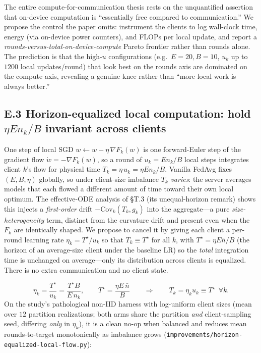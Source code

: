 \documentclass[11pt]{article}
\begin{document}
The entire compute-for-communication thesis rests on the unquantified assertion that on-device computation is ``essentially free compared to communication.'' We propose the control the paper omits: instrument the clients to log wall-clock time, energy (via on-device power counters), and FLOPs per local update, and report a \emph{rounds-versus-total-on-device-compute} Pareto frontier rather than rounds alone. The prediction is that the high-$u$ configurations (e.g.\ $E{=}20,B{=}10$, $u_k$ up to $1200$ local updates/round) that look best on the rounds axis are dominated on the compute axis, revealing a genuine knee rather than ``more local work is always better.''

\subsection*{E.3 Horizon-equalized local computation: hold $\eta E n_k/B$ invariant across clients}

One step of local SGD $w\leftarrow w-\eta\,\nabla F_k(w)$ is one forward-Euler step of the gradient flow $\dot w=-\nabla F_k(w)$, so a round of $u_k=En_k/B$ local steps integrates client $k$'s flow for physical time $T_k=\eta\,u_k=\eta E n_k/B$. Vanilla FedAvg fixes $(E,B,\eta)$ globally, so under client-size imbalance $T_k$ \emph{varies}: the server averages models that each flowed a different amount of time toward their own local optimum. The effective-ODE analysis of \S T.3 (its unequal-horizon remark) shows this injects a \emph{first-order} drift $-\mathrm{Cov}_k(T_k,g_k)$ into the aggregate---a pure \emph{size-heterogeneity} term, distinct from the curvature drift and present even when the $F_k$ are identically shaped. We propose to cancel it by giving each client a per-round learning rate $\eta_k=T^\star/u_k$ so that $T_k\equiv T^\star$ for all $k$, with $T^\star=\eta E\bar n/B$ (the horizon of an average-size client under the baseline LR) so the \emph{total} integration time is unchanged on average---only its distribution across clients is equalized. There is no extra communication and no client state.

\begin{equation}
\eta_k=\frac{T^\star}{u_k}=\frac{T^\star B}{E\,n_k},\qquad
T^\star=\frac{\eta E\,\bar n}{B}\qquad\Longrightarrow\qquad
T_k=\eta_k u_k\equiv T^\star\ \ \forall k.
\end{equation}
On the study's pathological non-IID harness with log-uniform client sizes (mean over $12$ partition realizations; both arms share the partition \emph{and} client-sampling seed, differing \emph{only} in $\eta_k$), it is a clean no-op when balanced and reduces mean rounds-to-target monotonically as imbalance grows (\texttt{improvements/horizon-equalized-local-flow.py}):
\end{document}
